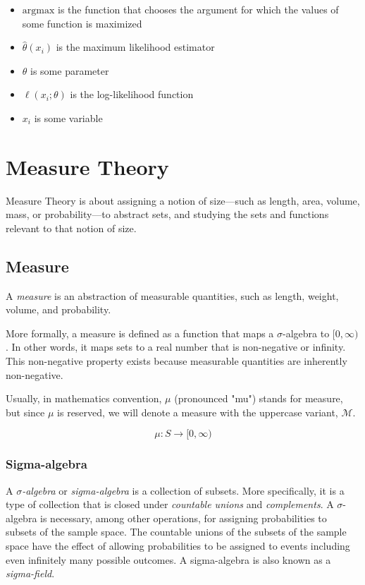 \documentclass{article}
\begin{document}
\begin{itemize}
    \item $\text{argmax}$ is the function that chooses the argument for which the values of some function is maximized
    \item $ \hat{\theta}(x_i) $ is the maximum likelihood estimator
    \item $ \theta $ is some parameter
    \item $ \ell(x_i; \theta) $ is the log-likelihood function
    \item $ x_i $ is some variable
\end{itemize}

\newpage
\section{Measure Theory}
Measure Theory is about assigning a notion of size—such as length, area, volume, mass, or probability—to abstract sets, and studying the sets and functions relevant to that notion of size.

\subsection{Measure}
A \emph{measure} is an abstraction of measurable quantities, such as length, weight, volume, and probability.

More formally, a measure is defined as a function that maps a $\sigma$-algebra to $[0,\infty)$. In other words, it maps sets to a real number that is non-negative or infinity. This non-negative property exists because measurable quantities are inherently non-negative.

Usually, in mathematics convention, $\mu$ (pronounced "mu") stands for measure, but since $\mu$ is reserved, we will denote a measure with the uppercase variant, $\mathcal{M}$. 

$$
\mu: S \rightarrow [0,\infty)
$$

\subsubsection{Sigma-algebra}
A \emph{$\sigma$-algebra} or \emph{sigma-algebra} is a collection of subsets. More specifically, it is a type of collection that is closed under \emph{countable unions} and \emph{complements}. A $\sigma$-algebra is necessary, among other operations, for assigning probabilities to subsets of the sample space. The countable unions of the subsets of the sample space have the effect of allowing probabilities to be assigned to events including even infinitely many possible outcomes. A sigma-algebra is also known as a \emph{sigma-field}.
\end{document}
